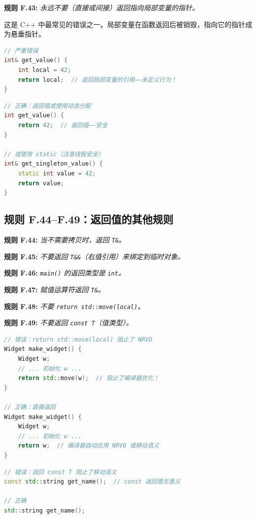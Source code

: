 \textbf{规则 F.43:} \textit{永远不要（直接或间接）返回指向局部变量的指针。}

这是 C++ 中最常见的错误之一。局部变量在函数返回后被销毁，指向它的指针成为悬垂指针。

\begin{lstlisting}[language=C++]
// 严重错误
int& get_value() {
    int local = 42;
    return local;  // 返回局部变量的引用——未定义行为！
}
\end{lstlisting}

\begin{lstlisting}[language=C++]
// 正确：返回值或使用动态分配
int get_value() {
    return 42;  // 返回值——安全
}

// 或使用 static（注意线程安全）
int& get_singleton_value() {
    static int value = 42;
    return value;
}
\end{lstlisting}

\subsection{规则 F.44--F.49：返回值的其他规则}

\textbf{规则 F.44:} \textit{当不需要拷贝时，返回 \texttt{T\&}。}

\textbf{规则 F.45:} \textit{不要返回 \texttt{T\&\&}（右值引用）来绑定到临时对象。}

\textbf{规则 F.46:} \textit{\texttt{main()} 的返回类型是 \texttt{int}。}

\textbf{规则 F.47:} \textit{赋值运算符返回 \texttt{T\&}。}

\textbf{规则 F.48:} \textit{不要 \texttt{return std::move(local)}。}

\textbf{规则 F.49:} \textit{不要返回 \texttt{const T}（值类型）。}

\begin{lstlisting}[language=C++]
// 错误：return std::move(local) 阻止了 NRVO
Widget make_widget() {
    Widget w;
    // ... 初始化 w ...
    return std::move(w);  // 阻止了编译器优化！
}

// 正确：直接返回
Widget make_widget() {
    Widget w;
    // ... 初始化 w ...
    return w;  // 编译器自动应用 NRVO 或移动语义
}
\end{lstlisting}

\begin{lstlisting}[language=C++]
// 错误：返回 const T 阻止了移动语义
const std::string get_name();  // const 返回值无意义

// 正确
std::string get_name();
\end{lstlisting}

